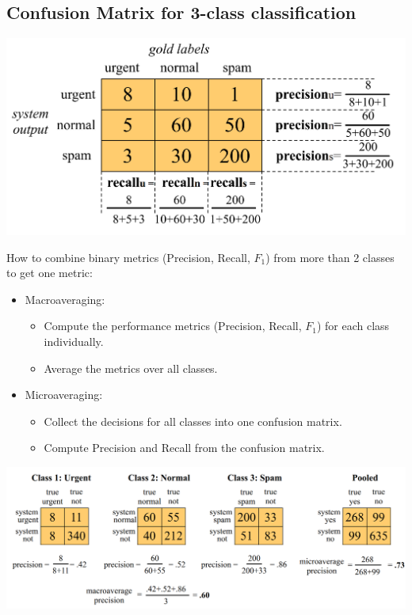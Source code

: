 \subsection{Confusion Matrix for 3-class classification}


\begin{center}
\includegraphics[scale=0.23]{pics/confmatrix.png}
\end{center}


How to combine binary metrics (Precision, Recall, $F_1$) from more than 2 classes to get one metric:
\begin{itemize}
 \item Macroaveraging:
 \begin{itemize}
    \item Compute the performance metrics (Precision, Recall, $F_1$) for each class individually.
    \item Average the metrics over all classes.
 \end{itemize}
 \item Microaveraging:
 \begin{itemize}
    \item Collect the decisions for all classes into one confusion matrix.
    \item Compute Precision and Recall from the confusion matrix.
 \end{itemize}
\end{itemize}



\begin{center}
\includegraphics[scale=0.23]{pics/confmatrixmulti.png}
\end{center}
